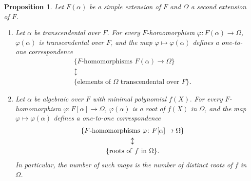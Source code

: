 \documentclass[a4paper,11pt,final,openany]{memoir}
\newtheorem{proposition}[X]{Proposition}
\theoremstyle{nonumberplain}
\begin{document}
\begin{proposition}
\label{sf1} Let $F(\alpha)$ be a simple extension of $F$ and $\Omega$ a second
extension of $F$.

\begin{enumerate}
\item Let $\alpha$ be transcendental over $F$. For every $F$-homomorphism
$\varphi\colon F(\alpha)\rightarrow\Omega$, $\varphi(\alpha)$ is
transcendental over $F$, and the map $\varphi\mapsto\varphi(\alpha)$ defines a
one-to-one correspondence
\begin{gather*}
\{F\text{-homomorphisms }F(\alpha)\rightarrow\Omega\}\\
\updownarrow \\
\{\text{elements of }\Omega\text{ transcendental over }F\}.
\end{gather*}


\item Let $\alpha$ be algebraic over $F$ with minimal polynomial $f(X)$. For
every $F$-homomorphism $\varphi\colon F[\alpha]\rightarrow\Omega$,
$\varphi(\alpha)$ is a root of $f(X)$ in $\Omega$, and the map $\varphi
\mapsto\varphi(\alpha)$ defines a one-to-one correspondence
\begin{gather*}
\{F\text{-homomorphisms }\varphi\colon F[\alpha]\rightarrow\Omega
\}\\
\updownarrow\\
\{\text{roots of\textrm{\ }}f\text{\ in }\Omega\}.
\end{gather*}
In particular, the number of such maps is the number of distinct roots of $f$
in $\Omega$.
\end{enumerate}
\end{proposition}
\end{document}
